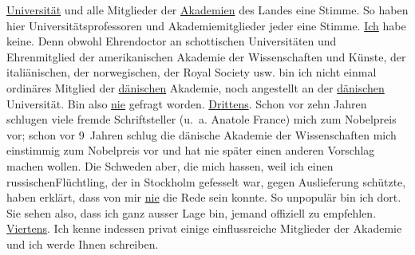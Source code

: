 \begin{ledgroupsized}[t]{13cm}
                  \uline{Universität} und alle Mitglieder der \uline{Akademien} des Landes eine Stimme. So haben hier
               Universitätsprofessoren und Akademiemitglieder jeder eine Stimme.\pend
           \pstart
           \uline{Ich} habe keine. Denn obwohl Ehrendoctor an schottischen Universitäten und Ehrenmitglied der
                  amerikanischen Akademie der Wissenschaften und
                  Künste, der italiänischen, der norwegischen, der Royal Society usw. bin
               ich nicht einmal ordinäres Mitglied der \uline{dänischen} Akademie, noch angestellt an der
                  \uline{dänischen} Universität.\pend
           \pstart
           Bin also \uline{nie} gefragt worden.\pend
           \pstart
           \uline{Drittens}. Schon vor zehn Jahren schlugen viele fremde
               Schriftsteller (u. a. Anatole France) mich zum
                  Nobelpreis vor; schon vor 9 Jahren schlug {\pb}die dänische Akademie der Wissenschaften mich einstimmig zum Nobelpreis vor und hat nie später einen anderen Vorschlag machen
               wollen. Die Schweden aber, die mich hassen,
               weil ich einen russischenFlüchtling, der in Stockholm gefesselt war, gegen Auslieferung
               schützte, haben erklärt, dass von mir \uline{nie} die Rede
               sein konnte. So unpopulär bin ich dort. Sie sehen also, dass ich ganz ausser Lage
               bin, jemand offiziell zu empfehlen.\pend
           \pstart
           \uline{Viertens}. Ich kenne indessen privat einige
               einflussreiche Mitglieder der Akademie und ich werde Ihnen schreiben.\pend

\end{ledgroupsized}
